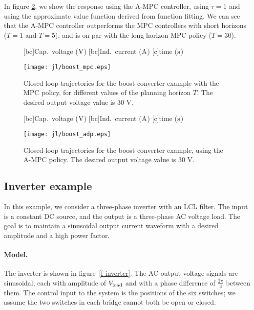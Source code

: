 \documentclass[12pt]{article}
\newif\ifarxiv
\begin{document}
In figure \ref{f-traj},
we show the response using
the A-MPC controller, using $\tau = 1$ and using the
approximate value function derived from function fitting.
We can see that the A-MPC controller outperforms the
MPC controllers with short horizons ($T = 1$ and $T =5$),
and is on par with the long-horizon MPC policy ($T=30$).


\begin{figure}
\centering
{}[bc]{Cap.\ voltage ($\rm V$)}
[bc]{Ind.\ current ($\rm A$)}
[c]{time ($\rm s$)}
\ifarxiv
\texttt{[image: boost\_mpc.eps]}
\else
\texttt{[image: jl/boost\_mpc.eps]}
\fi
\caption{
Closed-loop trajectories for the boost converter example with the MPC policy,
for different values of the planning horizon $T$.
The desired output voltage value is $30$ V.
}
\label{f-traj-mpc}
\end{figure}

\begin{figure}
\centering
{}[bc]{Cap.\ voltage ($\rm V$)}
[bc]{Ind.\ current ($\rm A$)}
[c]{time ($\rm s$)}
\ifarxiv
\texttt{[image: boost\_adp.eps]}
\else
\texttt{[image: jl/boost\_adp.eps]}
\fi
\caption{
Closed-loop trajectories for the boost converter example,
using the A-MPC policy.
The desired output voltage value is $30$ V.
}
\label{f-traj}
\end{figure}
















\subsection{Inverter example}
\label{s-inverter-example}
In this example, we consider a three-phase inverter
with an LCL filter.
The input is a constant DC source,
and the output is a three-phase AC voltage load.
The goal is to maintain a sinusoidal output current waveform
with a desired amplitude and a high power factor.

\paragraph{Model.}
The inverter is shown in figure~\ref{f-inverter}.
The AC output voltage signals are sinusoidal,
each with amplitude of $V_{\rm load}$
and with a phase difference of $\frac{2\pi}{3}$ between them.
The control input to the system is the positions of the six switches;
we assume the two switches in each bridge cannot both be open or closed.
\end{document}
